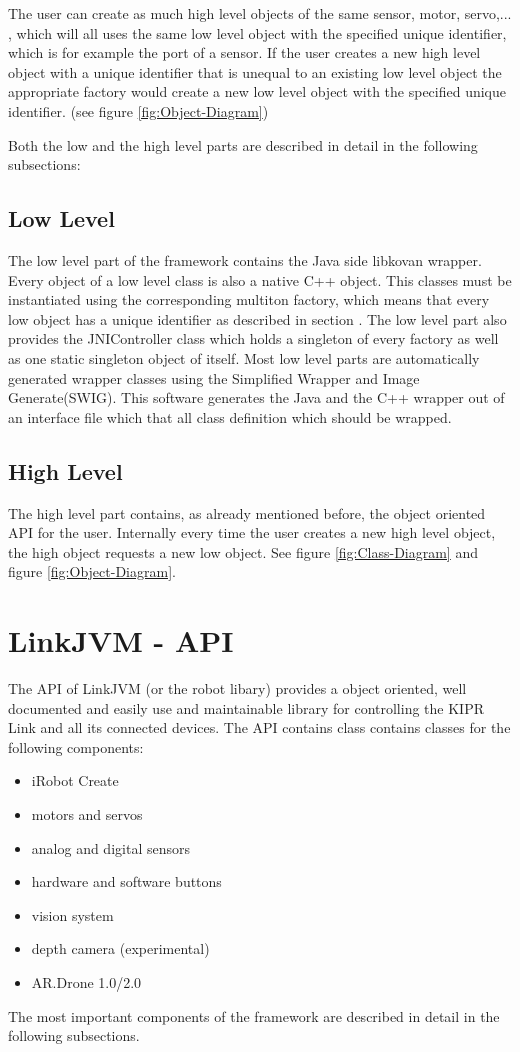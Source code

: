 \documentclass{juniorjournal}
\begin{document}
The user can create as much high level objects of the same sensor, motor, 
servo,... , which will all uses the same low level object with the specified 
unique identifier, which is for example the port of a sensor. If the user 
creates a new high level object with a unique identifier that is unequal to 
an existing low level object the appropriate factory would 
create a new low level object with the specified unique identifier. (see figure \ref{fig:Object-Diagram})

Both the low and the high level parts are described in detail in the following subsections:

\subsection{Low Level}
The low level part of the framework contains the Java\cite{Java} side libkovan\cite{libkovan} wrapper. 
Every object of a low level class is also a native C++ object.
This classes must be instantiated using the corresponding multiton factory, which means that every low object has a unique identifier as described in section .
The low level part also provides the JNIController class which holds a singleton of every factory as well as one static singleton object of itself.
Most low level parts are automatically generated wrapper classes using the Simplified Wrapper and Image Generate(SWIG).
This software generates the Java\cite{Java} and the C++ wrapper out of an interface file which that all class definition which should be wrapped.

\subsection{High Level}
The high level part contains, as already mentioned before, the object oriented API for the user. 
Internally every time the user creates a new high level object, the high object requests a new low object.
See figure \ref{fig:Class-Diagram} and figure \ref{fig:Object-Diagram}.

\section{LinkJVM - API}
The API of LinkJVM (or the robot libary) provides a object oriented, well documented and easily use and maintainable library for controlling the KIPR\cite{KIPR} Link\cite{link}
 and all its connected devices.
The API contains class contains classes for the following components:
\begin{itemize}
	\item iRobot Create\cite{create}
	\item motors and servos
	\item analog and digital sensors
	\item hardware and software buttons
	\item vision system
	\item depth camera (experimental)
	\item AR.Drone 1.0/2.0\cite{ar.drone}
\end{itemize}
The most important components of the framework are described in detail in the following subsections.
\end{document}
